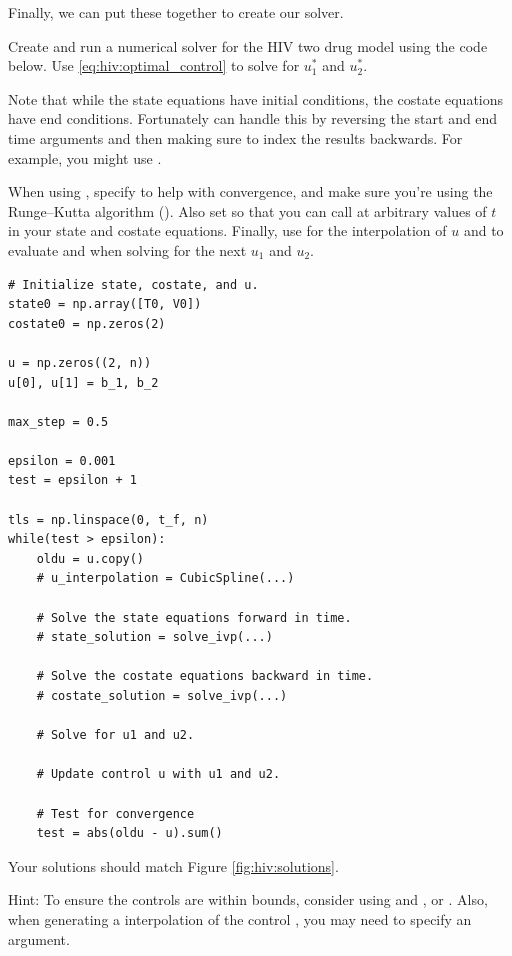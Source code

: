 Finally, we can put these together to create our solver.
\begin{problem}
Create and run a numerical solver for the HIV two drug model using the code below.
Use \eqref{eq:hiv:optimal_control} to solve for $u_1^*$ and $u_2^*$.

Note that while the state equations have initial conditions, the costate equations have end conditions.
Fortunately  can handle this by reversing the start and end time arguments and then making sure to index the results backwards.
For example, you might use .

When using , specify  to help with convergence, and make sure you're using the Runge--Kutta algorithm ().
Also set  so that you can call  at arbitrary values of $t$ in your state and costate equations.
Finally, use  for the  interpolation of $u$ and to evaluate  and  when solving for the next $u_1$ and $u_2$.

\begin{lstlisting}
# Initialize state, costate, and u.
state0 = np.array([T0, V0])
costate0 = np.zeros(2)

u = np.zeros((2, n))
u[0], u[1] = b_1, b_2

max_step = 0.5

epsilon = 0.001
test = epsilon + 1

tls = np.linspace(0, t_f, n)
while(test > epsilon):
    oldu = u.copy()
    # u_interpolation = CubicSpline(...)

    # Solve the state equations forward in time.
    # state_solution = solve_ivp(...)

    # Solve the costate equations backward in time.
    # costate_solution = solve_ivp(...)

    # Solve for u1 and u2.
    
    # Update control u with u1 and u2.

    # Test for convergence
    test = abs(oldu - u).sum()
\end{lstlisting}

Your solutions should match Figure \ref{fig:hiv:solutions}.

\noindent Hint: To ensure the controls are within bounds, consider using  and , or .
Also, when generating a  interpolation of the control , you may need to specify an  argument.
\label{problem:hiv:solver}

\label{problem:hiv:numericalsolver}
\end{problem}

